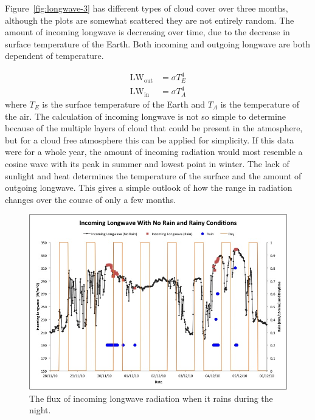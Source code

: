 \documentclass[a4paper,titlepage, twoside]{report}
\begin{document}
Figure~\ref{fig:longwave-3} has different types of cloud cover over three months, although the plots are somewhat scattered they are not entirely random.  The amount of incoming longwave is decreasing over time, due to the decrease in surface temperature of the Earth.  Both incoming and outgoing longwave are both dependent of temperature.

\begin{align}
\mathrm{LW_{out}} &= \sigma T_E^4 \\
\mathrm{LW_{in}} &= \sigma T_A^4
\end{align}
where $T_E$ is the surface temperature of the Earth and $T_A$ is the temperature of the air.  The calculation of incoming longwave is not so simple to determine because of the multiple layers of cloud that could be present in the atmosphere, but for a cloud free atmosphere this can be applied for simplicity.  If this data were for a whole year, the amount of incoming radiation would most resemble a cosine wave with its peak in summer and lowest point in winter.  The lack of sunlight and heat determines the temperature of the surface and the amount of outgoing longwave.  This gives a simple outlook of how the range in radiation changes over the course of only a few months.

\begin{figure}
\includegraphics[width=\textwidth]{5.jpg}
\caption{The flux of incoming longwave radiation when it rains during the night.}
\label{fig:longwave-5}
\end{figure}
\end{document}
